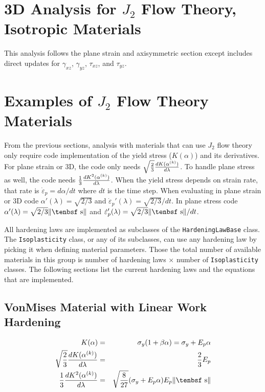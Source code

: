 \documentclass[11pt]{book}
\def\dev{\hbox{\tenbsf s}}
\begin{document}
\section{3D Analysis for $J_2$ Flow Theory, Isotropic Materials}

This analysis follows the plane strain and axisymmetric section except includes direct updates for $\gamma_{xz}$, $\gamma_{yz}$, $\tau_{xz}$, and $\tau_{yz}$.


\section{Examples of $J_2$ Flow Theory Materials\label{HardLaws}}

From the previous sections, analysis with materials that can use $J_2$ flow theory only require code implementation of the yield stress ($K(\alpha)$) and its derivatives. For plane strain or 3D, the code only needs $\sqrt{2\over3}{dK(\alpha^{(k)})\over d\lambda}$. To handle plane stress as well, the code needs ${1\over3}{dK^2(\alpha^{(k)})\over d\lambda}$. When the yield stress depends on strain rate, that rate is $\dot{\varepsilon}_p = d\alpha/dt$ where $dt$ is the time step. When evaluating in plane strain or 3D code $\alpha'(\lambda) = \sqrt{2/3}$ and $\dot{\varepsilon}_p'(\lambda) = \sqrt{2/3}/dt$. In plane stress code $\alpha'(\lambda) = \sqrt{2/3}\|\dev\|$ and $\dot{\varepsilon}_p'(\lambda) = \sqrt{2/3}\|\dev\|/dt$.

All hardening laws are implemented as subclasses of the {\tt HardeningLawBase} class. The {\tt Isoplast\-icity} class, or any of its subclasses, can use any hardening law by picking it when defining material parameters. Those the total  number of available materials in this group is number of hardening laws $\times$ number of  {\tt Isoplasticity} classes. The following sections list the current hardening laws and the equations that are implemented.

\subsection{VonMises Material with Linear Work Hardening}

\begin{eqnarray}
   K(\alpha) & = & \sigma_y(1+\beta\alpha) =  \sigma_y + E_p\alpha \\
   \sqrt{2\over3}{dK(\alpha^{(k)})\over d\lambda} & = & {2\over 3}E_p \\
   {1\over3}{dK^2(\alpha^{(k)})\over d\lambda} & = & \sqrt{8\over27} (\sigma_y + E_p\alpha)E_p \|\dev\|
\end{eqnarray}
\end{document}
